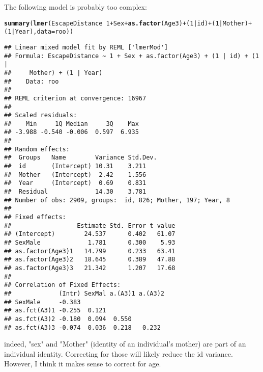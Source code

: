 \documentclass[12pt,a4paper]{scrartcl}\usepackage[]{graphicx}\usepackage[]{color}
\makeatletter
\newcommand{\hlnum}[1]{\textcolor[rgb]{0.686,0.059,0.569}{#1}}%
\newcommand{\hlopt}[1]{\textcolor[rgb]{0,0,0}{#1}}%
\newcommand{\hlstd}[1]{\textcolor[rgb]{0.345,0.345,0.345}{#1}}%
\newcommand{\hlkwc}[1]{\textcolor[rgb]{0.333,0.667,0.333}{#1}}%
\newcommand{\hlkwd}[1]{\textcolor[rgb]{0.737,0.353,0.396}{\textbf{#1}}}%
\newenvironment{kframe}{%
 \def\at@end@of@kframe{}%
 \ifinner\ifhmode%
  \def\at@end@of@kframe{\end{minipage}}%
  \begin{minipage}{\columnwidth}%
 \fi\fi%
 \def\FrameCommand##1{\hskip\@totalleftmargin \hskip-\fboxsep
 \colorbox{shadecolor}{##1}\hskip-\fboxsep
     \hskip-\linewidth \hskip-\@totalleftmargin \hskip\columnwidth}%
 \MakeFramed {\advance\hsize-\width
   \@totalleftmargin\z@ \linewidth\hsize
   \@setminipage}}%
 {\par\unskip\endMakeFramed%
 \at@end@of@kframe}
\newenvironment{knitrout}{}{} %
\makeatother
\begin{document}
\begin{Answer}
The following model is probably too complex:
\begin{knitrout}
\color{fgcolor}\begin{kframe}
\begin{alltt}
\hlkwd{summary}\hlstd{(}\hlkwd{lmer}\hlstd{(EscapeDistance} \hlopt{~} \hlnum{1} \hlopt{+} \hlstd{Sex} \hlopt{+} \hlkwd{as.factor}\hlstd{(Age3)} \hlopt{+} \hlstd{(}\hlnum{1}\hlopt{|}\hlstd{id)} \hlopt{+} \hlstd{(}\hlnum{1}\hlopt{|}\hlstd{Mother)} \hlopt{+} \hlstd{(}\hlnum{1}\hlopt{|}\hlstd{Year),} \hlkwc{data}\hlstd{=roo))}
\end{alltt}
\begin{verbatim}
## Linear mixed model fit by REML ['lmerMod']
## Formula: EscapeDistance ~ 1 + Sex + as.factor(Age3) + (1 | id) + (1 |  
##     Mother) + (1 | Year)
##    Data: roo
## 
## REML criterion at convergence: 16967
## 
## Scaled residuals: 
##    Min     1Q Median     3Q    Max 
## -3.988 -0.540 -0.006  0.597  6.935 
## 
## Random effects:
##  Groups   Name        Variance Std.Dev.
##  id       (Intercept) 10.31    3.211   
##  Mother   (Intercept)  2.42    1.556   
##  Year     (Intercept)  0.69    0.831   
##  Residual             14.30    3.781   
## Number of obs: 2909, groups:  id, 826; Mother, 197; Year, 8
## 
## Fixed effects:
##                  Estimate Std. Error t value
## (Intercept)        24.537      0.402   61.07
## SexMale             1.781      0.300    5.93
## as.factor(Age3)1   14.799      0.233   63.41
## as.factor(Age3)2   18.645      0.389   47.88
## as.factor(Age3)3   21.342      1.207   17.68
## 
## Correlation of Fixed Effects:
##             (Intr) SexMal a.(A3)1 a.(A3)2
## SexMale     -0.383                       
## as.fct(A3)1 -0.255  0.121                
## as.fct(A3)2 -0.180  0.094  0.550         
## as.fct(A3)3 -0.074  0.036  0.218   0.232
\end{verbatim}
\end{kframe}
\end{knitrout}
indeed, "sex" and "Mother" (identity of an individual's mother) are part of an individual identity. Correcting for those will likely reduce the id variance. However, I think it makes sense to correct for age.



\end{Answer}
\end{document}
